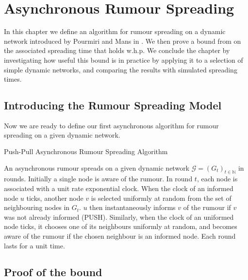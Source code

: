 \chapter{Asynchronous Rumour Spreading}
\label{chapter:AsyncUpperBound}

In this chapter we define an algorithm for rumour spreading on a dynamic network introduced by Pourmiri and Mans in \cite{asyncPaper}. We then prove a bound from \cite{asyncPaper} on the associated spreading time that holds w.h.p. We conclude the chapter by investigating how useful this bound is in practice by applying it to a selection of simple dynamic networks, and comparing the results with simulated spreading times. 

\section{Introducing the Rumour Spreading Model}
Now we are ready to define our first asynchronous algorithm for rumour spreading on a given dynamic network.

\begin{definition}
	Push-Pull Asynchronous Rumour Spreading Algorithm 
\end{definition}
\label{NodeCentricAsyncAlgorithm}

\noindent
An asynchronous rumour spreads on a given dynamic network $\mathcal{G} = (G_t)_{t\in \mathbb{N}}$ in rounds. Initially a single node is aware of the rumour. In round $t$, each node is associated with a unit rate exponential clock. When the clock of an informed node $u$ ticks, another node $v$ is selected uniformly at random from the set of neighbouring nodes in $G_t$. $u$ then instantaneously informs $v$ of the rumour if $v$ was not already informed (PUSH). Similarly, when the clock of an uniformed node ticks, it chooses one of its neighbours uniformly at random, and becomes aware of the rumour if the chosen neighbour is an informed node. Each round lasts for a unit time. %




\section{Proof of the bound}

